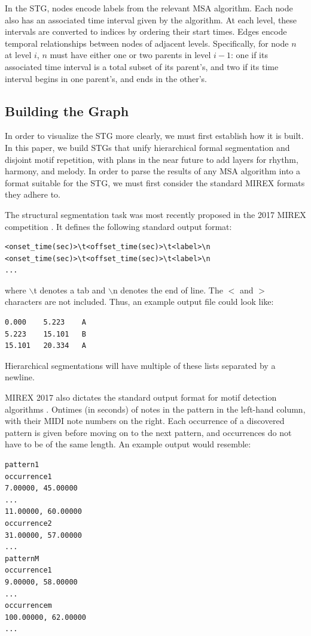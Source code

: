 \documentclass{article}
\begin{document}
In the STG, nodes encode labels from the relevant MSA algorithm. Each node also has an associated time interval given by the algorithm. At each level, these intervals are converted to indices by ordering their start times. Edges encode temporal relationships between nodes of adjacent levels. Specifically, for node $n$ at level $i$, $n$ must have either one or two parents in level $i-1$: one if its associated time interval is a total subset of its parent's, and two if its time interval begins in one parent's, and ends in the other's.

\subsection{Building the Graph}\label{subsec:build}

In order to visualize the STG more clearly, we must first establish how it is built. In this paper, we build STGs that unify hierarchical formal segmentation and disjoint motif repetition, with plans in the near future to add layers for rhythm, harmony, and melody. In order to parse the results of any MSA algorithm into a format suitable for the STG, we must first consider the standard MIREX formats they adhere to. 

The structural segmentation task was most recently proposed in the 2017 MIREX competition \cite{MIREX_2017_form}. It defines the following standard output format:
\begin{lstlisting}
<onset_time(sec)>\t<offset_time(sec)>\t<label>\n
<onset_time(sec)>\t<offset_time(sec)>\t<label>\n
...
\end{lstlisting}
where $\backslash$t denotes a tab and $\backslash$n denotes the end of line. The $<$ and $>$ characters are not included. Thus, an example output file could look like:
\begin{lstlisting}
0.000    5.223    A
5.223    15.101   B
15.101   20.334   A
\end{lstlisting}
Hierarchical segmentations will have multiple of these lists separated by a newline.

MIREX 2017 also dictates the standard output format for motif detection algorithms \cite{MIREX_2017_motif}. Ontimes (in seconds) of notes in the pattern in the left-hand column, with their MIDI note numbers on the right. Each occurrence of a discovered pattern is given before moving on to the next pattern, and occurrences do not have to be of the same length. An example output would resemble:
\begin{lstlisting}
pattern1 
occurrence1 
7.00000, 45.00000 
... 
11.00000, 60.00000 
occurrence2 
31.00000, 57.00000 
...
patternM 
occurrence1 
9.00000, 58.00000 
...
occurrencem 
100.00000, 62.00000 
...
\end{lstlisting}
\end{document}
